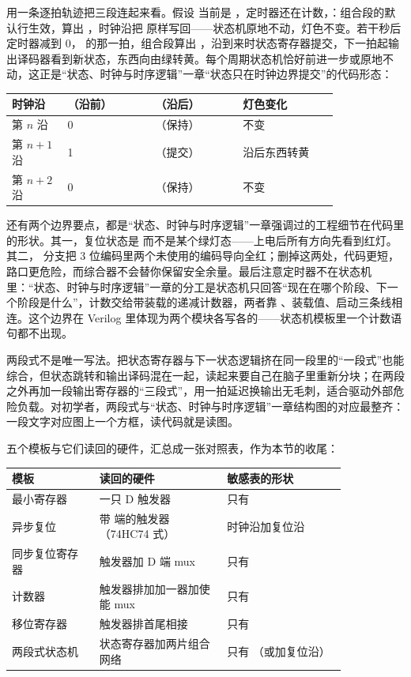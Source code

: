 用一条逐拍轨迹把三段连起来看。假设  当前是 ，定时器还在计数，：组合段的默认行生效，算出 ，时钟沿把  原样写回——状态机原地不动，灯色不变。若干秒后定时器减到 0， 的那一拍，组合段算出 ，沿到来时状态寄存器提交，下一拍起输出译码器看到新状态，东西向由绿转黄。每个周期状态机恰好前进一步或原地不动，这正是“状态、时钟与时序逻辑”一章“状态只在时钟边界提交”的代码形态：

\begin{longtable}{L{0.14\linewidth}L{0.22\linewidth}L{0.22\linewidth}L{0.24\linewidth}}
\toprule
时钟沿 & （沿前） & （沿后） & 灯色变化 \\
\midrule
第 $n$ 沿 & 0 & （保持） & 不变 \\\tablerowrule
第 $n+1$ 沿 & 1 & （提交） & 沿后东西转黄 \\\tablerowrule
第 $n+2$ 沿 & 0 & （保持） & 不变 \\
\bottomrule
\end{longtable}

还有两个边界要点，都是“状态、时钟与时序逻辑”一章强调过的工程细节在代码里的形状。其一，复位状态是  而不是某个绿灯态——上电后所有方向先看到红灯。其二， 分支把 3 位编码里两个未使用的编码导向全红；删掉这两处，代码更短，路口更危险，而综合器不会替你保留安全余量。最后注意定时器不在状态机里：“状态、时钟与时序逻辑”一章的分工是状态机只回答“现在在哪个阶段、下一个阶段是什么”，计数交给带装载的递减计数器，两者靠 、装载值、启动三条线相连。这个边界在 Verilog 里体现为两个模块各写各的——状态机模板里一个计数语句都不出现。

两段式不是唯一写法。把状态寄存器与下一状态逻辑挤在同一段里的“一段式”也能综合，但状态跳转和输出译码混在一起，读起来要自己在脑子里重新分块；在两段之外再加一段输出寄存器的“三段式”，用一拍延迟换输出无毛刺，适合驱动外部危险负载。对初学者，两段式与“状态、时钟与时序逻辑”一章结构图的对应最整齐：一段文字对应图上一个方框，读代码就是读图。

五个模板与它们读回的硬件，汇总成一张对照表，作为本节的收尾：

\begin{longtable}{L{0.22\linewidth}L{0.32\linewidth}L{0.30\linewidth}}
\toprule
模板 & 读回的硬件 & 敏感表的形状 \\
\midrule
最小寄存器 & 一只 D 触发器 & 只有  \\\tablerowrule
异步复位 & 带  端的触发器（74HC74 式） & 时钟沿加复位沿 \\\tablerowrule
同步复位寄存器 & 触发器加 D 端 mux & 只有  \\\tablerowrule
计数器 & 触发器排加加一器加使能 mux & 只有  \\\tablerowrule
移位寄存器 & 触发器排首尾相接 & 只有  \\\tablerowrule
两段式状态机 & 状态寄存器加两片组合网络 & 只有 （或加复位沿） \\
\bottomrule
\end{longtable}

